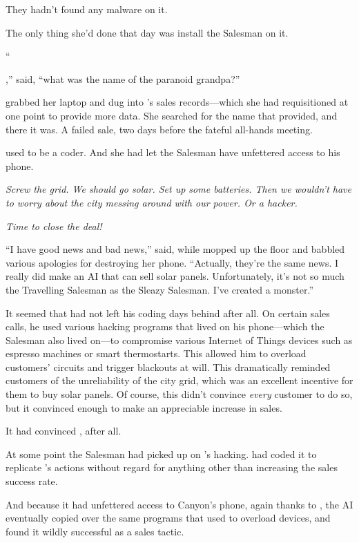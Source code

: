 They hadn't found any malware on it.

The only thing she'd done that day was install the Salesman on it.

``{\sidetag,'' {\protag} said, ``what was the name of the paranoid grandpa?''

{\protag} grabbed her laptop and dug into {\energyJerk}'s sales records---which she had requisitioned at one point to provide more data. She searched for the name that {\sidetag} provided, and there it was. A failed sale, two days before the fateful all-hands meeting.

{\energyJerk} used to be a coder. And she had let the Salesman have unfettered access to his phone.

\emph{Screw the grid. We should go solar. Set up some batteries. Then we wouldn't have to worry about the city messing around with our power. Or a hacker.}

\emph{Time to close the deal!}

``I have good news and bad news,'' {\protag} said, while {\sidetag} mopped up the floor and babbled various apologies for destroying her phone. ``Actually, they're the same news. I really did make an AI that can sell solar panels. Unfortunately, it's not so much the Travelling Salesman as the Sleazy Salesman. I've created a monster.''

\bigbreak

It seemed that {\energyJerk} had not left his coding days behind after all. On certain sales calls, he used various hacking programs that lived on his phone---which the Salesman also lived on---to compromise various Internet of Things devices such as espresso machines or smart thermostarts. This allowed him to overload customers' circuits and trigger blackouts at will. This dramatically reminded customers of the unreliability of the city grid, which was an excellent incentive for them to buy solar panels. Of course, this didn't convince \emph{every} customer to do so, but it convinced enough to make an appreciable increase in sales.

It had convinced {\protag}, after all.

At some point the Salesman had picked up on {\energyJerk}'s hacking. {\protag} had coded it to replicate {\energyJerk}'s actions without regard for anything other than increasing the sales success rate.

And because it had unfettered access to Canyon's phone, again thanks to {\protag}, the AI eventually copied over the same programs that {\energyJerk} used to overload devices, and found it wildly successful as a sales tactic.

}
